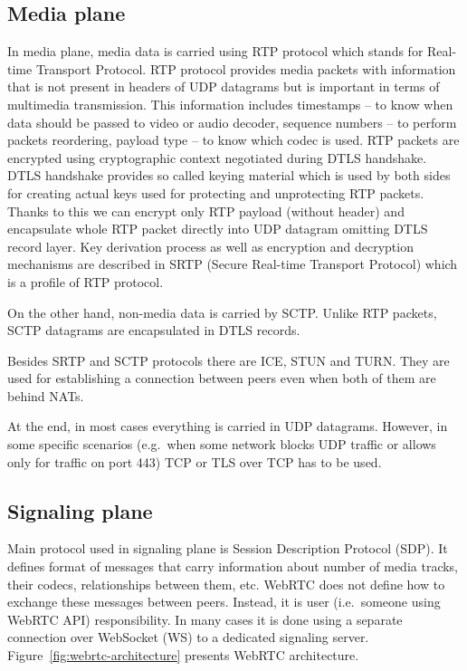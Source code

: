 \subsection{Media plane}
\label{subsec:media-plane}
In media plane, media data is carried using RTP protocol which stands for Real-time Transport Protocol.
RTP protocol provides media packets with information that is not present in headers of UDP datagrams but is important in terms of multimedia transmission.
This information includes timestamps -- to know when data should be passed to video or audio decoder, sequence numbers -- to perform packets reordering, payload type -- to know which codec is used.
RTP packets are encrypted using cryptographic context negotiated during DTLS handshake.
DTLS handshake provides so called keying material which is used by both sides for creating actual keys used for protecting and unprotecting RTP packets.
Thanks to this we can encrypt only RTP payload (without header) and encapsulate whole RTP packet directly into UDP datagram omitting DTLS record layer.
Key derivation process as well as encryption and decryption mechanisms are described in SRTP (Secure Real-time Transport Protocol) which is a profile of RTP protocol.

On the other hand, non-media data is carried by SCTP\@.
Unlike RTP packets, SCTP datagrams are encapsulated in DTLS records.

Besides SRTP and SCTP protocols there are ICE, STUN and TURN\@.
They are used for establishing a connection between peers even when both of them are behind NATs.

At the end, in most cases everything is carried in UDP datagrams.
However, in some specific scenarios (e.g.\ when some network blocks UDP traffic or allows only for traffic on port 443) TCP or TLS over TCP has to be used.

\subsection{Signaling plane}
\label{subsec:signaling-plane}
Main protocol used in signaling plane is Session Description Protocol (SDP).
It defines format of messages that carry information about number of media tracks, their codecs, relationships between them, etc.
WebRTC does not define how to exchange these messages between peers.
Instead, it is user (i.e.\ someone using WebRTC API) responsibility.
In many cases it is done using a separate connection over WebSocket (WS) to a dedicated signaling server.
Figure~\ref{fig:webrtc-architecture} presents WebRTC architecture.

